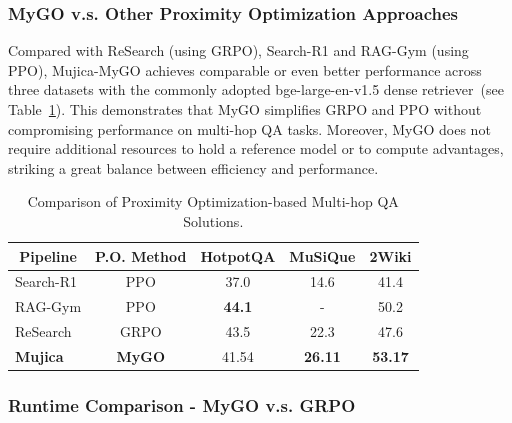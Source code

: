 \subsubsection{\textbf{MyGO v.s. Other Proximity Optimization Approaches}} 
Compared with ReSearch (using GRPO), Search-R1 and RAG-Gym (using PPO), Mujica-MyGO achieves comparable or even better performance across three datasets with the commonly adopted bge-large-en-v1.5 dense retriever~(see Table~\ref{po_solutions}). This demonstrates that MyGO simplifies GRPO and PPO without compromising performance on multi-hop QA tasks. Moreover, MyGO does not require additional resources to hold a reference model or to compute advantages, striking a great balance between efficiency and performance. 


\begin{table}[h!]
\centering
\caption{Comparison of Proximity Optimization-based Multi-hop QA Solutions.
}
    \vspace{-0.5em}
\begin{tabular}{lcccc}
\toprule
\multicolumn{1}{c}{\textbf{Pipeline}} & \textbf{P.O. Method} & \textbf{HotpotQA} & \textbf{MuSiQue} & \textbf{2Wiki} \\
\midrule
Search-R1                    & PPO                  & 37.0     & 14.6    & 41.4  \\
RAG-Gym                      & PPO                  & \textbf{44.1}     & -       & 50.2  \\
ReSearch                     & GRPO                 & 43.5     & 22.3    & 47.6  \\
\midrule
\textbf{Mujica}                       & \textbf{MyGO}                 & 41.54    & \textbf{26.11}   & \textbf{53.17} \\
\bottomrule
\end{tabular}
\label{po_solutions}
\end{table}



\subsubsection{\textbf{Runtime Comparison - MyGO v.s. GRPO}}

